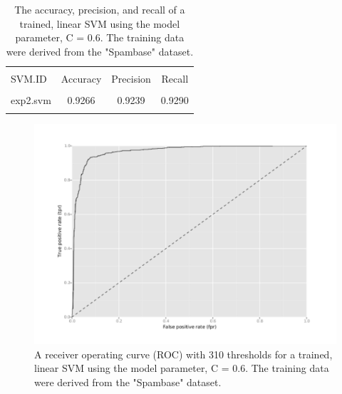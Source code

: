 \documentclass[12pt]{article}
\begin{document}
\begin{table}[!htbp] \centering 
  \caption{The accuracy, precision, and recall of a trained, linear SVM using the model parameter, C = 0.6. The training data were derived from the "Spambase" dataset.} 
  \label{} 
\begin{tabular}{lccc} 
\\[-1.8ex]\hline 
\hline \\[-1.8ex] 
 SVM.ID & {Accuracy} & {Precision} & {Recall}\\
\hline \\[-1.8ex]
exp2.svm & 0.9266 & 0.9239 & 0.9290\\
\hline \\[-1.8ex]
\end{tabular} 
\end{table}

\begin{figure}
	\begin{center}
		\includegraphics{exp2_roc.pdf}
		\caption{A receiver operating curve (ROC) with 310 thresholds for a trained, linear SVM using the model parameter, C = 0.6. The training data were derived from the "Spambase" dataset.}
	\end{center}
\end{figure}
\end{document}
